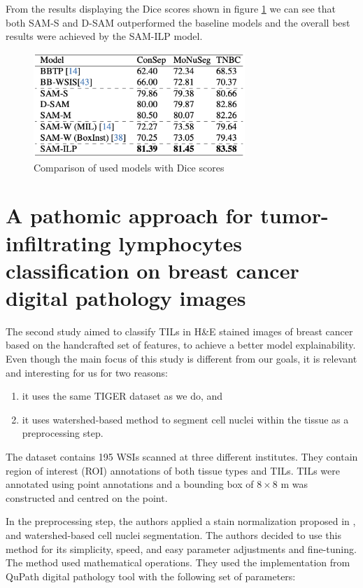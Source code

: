 From the results displaying the Dice scores shown in figure \ref{fig:rw-sam-dice} we can see that both SAM-S and D-SAM outperformed the baseline models and the overall best results were achieved by the SAM-ILP model.

\begin{figure}[H]
    \begin{centering}
    \includegraphics[width=8cm]{assets/images/rw-table-dice.png}
    \par\end{centering}
    \caption{Comparison of used models with Dice scores}
    \label{fig:rw-sam-dice}
\end{figure}

\section{A pathomic approach for tumor-infiltrating lymphocytes classification on breast cancer digital pathology images \cite{Verdicchio2023}}
The second study aimed to classify TILs in H\&E stained images of breast cancer based on the handcrafted set of features, to achieve a better model explainability. Even though the main focus of this study is different from our goals, it is relevant and interesting for us for two reasons:

\begin{enumerate}
    \item it uses the same TIGER dataset \cite{tiger_dataset} as we do, and
    \item it uses watershed-based method to segment cell nuclei within the tissue as a preprocessing step.
\end{enumerate}

The dataset contains 195 WSIs scanned at three different institutes. They contain region of interest (ROI) annotations of both tissue types and TILs. TILs were annotated using point annotations and a bounding box of $8 \!\times\! 8$ \textmu m was constructed and centred on the point.

In the preprocessing step, the authors applied a stain normalization proposed in \cite{Vahadane2015}, and watershed-based cell nuclei segmentation. The authors decided to use this method for its simplicity, speed, and easy parameter adjustments and fine-tuning. The method used mathematical operations. They used the implementation from QuPath digital pathology tool with the following set of parameters:

